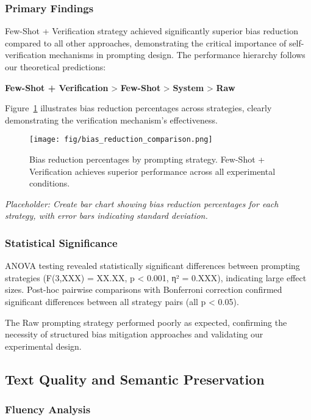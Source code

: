 \subsubsection{Primary Findings}

Few-Shot + Verification strategy achieved significantly superior bias reduction compared to all other approaches, demonstrating the critical importance of self-verification mechanisms in prompting design. The performance hierarchy follows our theoretical predictions:

\textbf{Few-Shot + Verification} > \textbf{Few-Shot} > \textbf{System} > \textbf{Raw}

Figure~\ref{fig:bias_reduction} illustrates bias reduction percentages across strategies, clearly demonstrating the verification mechanism's effectiveness.

\begin{figure}[htbp]
\centerline{\texttt{[image: fig/bias\_reduction\_comparison.png]}}
\caption{Bias reduction percentages by prompting strategy. Few-Shot + Verification achieves superior performance across all experimental conditions.}
\label{fig:bias_reduction}
\end{figure}

\textit{Placeholder: Create bar chart showing bias reduction percentages for each strategy, with error bars indicating standard deviation.}

\subsubsection{Statistical Significance}

ANOVA testing revealed statistically significant differences between prompting strategies (F(3,XXX) = XX.XX, p < 0.001, η² = 0.XXX), indicating large effect sizes. Post-hoc pairwise comparisons with Bonferroni correction confirmed significant differences between all strategy pairs (all p < 0.05).

The Raw prompting strategy performed poorly as expected, confirming the necessity of structured bias mitigation approaches and validating our experimental design.

\subsection{Text Quality and Semantic Preservation}

\subsubsection{Fluency Analysis}


